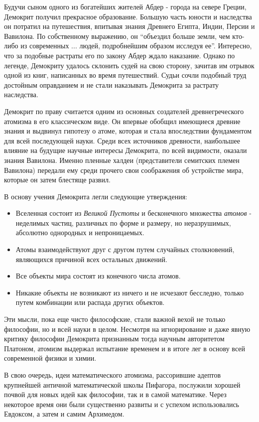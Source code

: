 Будучи сыном одного из богатейших жителей Абдер - города на севере Греции, Демокрит получил прекрасное образование.
Большую часть юности и наследства он потратил на путешествия, впитывая знания Древнего Египта, Индии, Персии и Вавилона.
По собственному выражению, он ``объездил больше земли, чем кто-либо из современных ... людей, подробнейшим образом исследуя ее''.
Интересно, что за подобные растраты его по закону Абдер ждало наказание.
Однако по легенде, Демокриту удалось склонить судей на свою сторону, зачитав им отрывок одной из книг, написанных во время путешествий.
Судьи сочли подобный труд достойным оправданием и не стали наказывать Демокрита за растрату наследства. 

Демокрит по праву считается одним из основных создателей древнегреческого атомизма в его классическом виде.
Он впервые обобщил имеющиеся древние знания и выдвинул гипотезу о атоме, которая и стала впоследствии фундаментом для всей последующей науки.
Среди всех источников древности, наибольшее влияние на будущие научные интересы Демокрита, по всей видимости, оказали знания Вавилона.
Именно пленные халдеи (представители семитских племен Вавилона) передали ему среди прочего свои соображения об устройстве мира, которые он затем блестяще развил.

В основу учения Демокрита легли следующие утверждения:
\begin{itemize}
    \item Вселенная состоит из \textit{Великой Пустоты} и бесконечного множества \textit{атомов} - неделимых частиц, различных по форме и размеру, но неразрушимых, абсолютно однородных и непроницаемых.
    \item Атомы взаимодействуют друг с другом путем случайных столкновений, являющихся причиной всех остальных движений. 
    \item Все объекты мира состоят из конечного числа атомов.
    \item Никакие объекты не возникают из ничего и не исчезают бесследно, только путем комбинации или распада других объектов.
\end{itemize} 
Эти мысли, пока еще чисто философские, стали важной вехой не только философии, но и всей науки в целом.
Несмотря на игнорирование и даже явную критику философии Демокрита признанным тогда научным авторитетом Платоном, атомизм выдержал испытание временем и в итоге лег в основу всей современной физики и химии.

В свою очередь, идеи математического атомизма, рассорившие адептов крупнейшей античной математической школы Пифагора, послужили хорошей почвой для новых идей как философии, так и в самой математике.
Через некоторое время они были существенно развиты и с успехом использовались Евдоксом, а затем и самим Архимедом.

